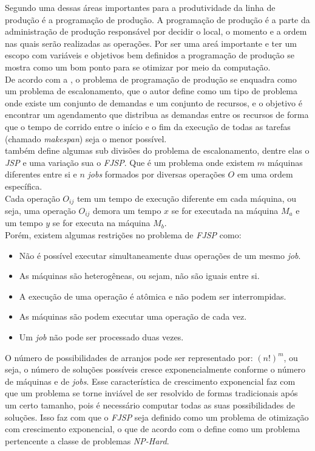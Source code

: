 \indent Segundo  uma dessas áreas importantes para a produtividade da linha de produção é a programação de produção. 
A programação de produção é a parte da administração de produção responsável por decidir o local, o momento e a ordem nas quais serão realizadas as operações. 
Por ser uma areá importante e ter um escopo com variáveis e objetivos bem definidos a programação de produção se mostra como um bom ponto para se otimizar por meio da computação.\\
\indent De acordo com a , o problema de programação de produção se enquadra como um problema de escalonamento, que o autor define como um tipo de problema onde existe um conjunto de demandas e um conjunto de recursos, e o objetivo é encontrar um agendamento que distribua as demandas entre os recursos de forma que o tempo de corrido entre o início e o fim da execução de todas as tarefas (chamado \textit{makespan}) seja o menor possível.\\
\indent {} também define algumas sub divisões do problema de escalonamento, dentre elas o \textit{JSP} e uma variação sua o \textit{FJSP}. 
Que é um problema onde existem $m$ máquinas diferentes entre si e $n$ \textit{jobs} formados por diversas operações $O$ em uma ordem específica.\\
Cada operação $O_{ij}$ tem um tempo de execução diferente em cada máquina, ou seja, uma operação 
$O_{ij}$ demora um tempo $x$ se for executada na máquina $M_a$ e um tempo $y$ se for executa na máquina $M_b$.\\
Porém, existem algumas restrições no problema de \textit{FJSP} como:
\begin{itemize}
    \item Não é possível executar simultaneamente duas operações de um mesmo \textit{job}.
    \item As máquinas são heterogêneas, ou sejam, não são iguais entre si.
    \item A execução de uma operação é atômica e não podem ser interrompidas.
    \item As máquinas são podem executar uma operação de cada vez.
    \item Um \textit{job} não pode ser processado duas vezes.
\end{itemize}

O número de possibilidades de arranjos pode ser representado por: $(n!)^m$, ou seja, o número de soluções possíveis cresce exponencialmente conforme o número de máquinas e de \textit{jobs}.
Esse característica de crescimento exponencial faz com que um problema se torne inviável de ser resolvido de formas tradicionais após um certo tamanho, pois é necessário computar todas as suas possibilidades de soluções.
Isso faz com que o \textit{FJSP} seja definido como um problema de otimização com crescimento exponencial, o que de acordo com \citeauthor{Eswaramurthy2008} o define como um problema pertencente a classe de problemas \textit{NP-Hard}.\hfill

